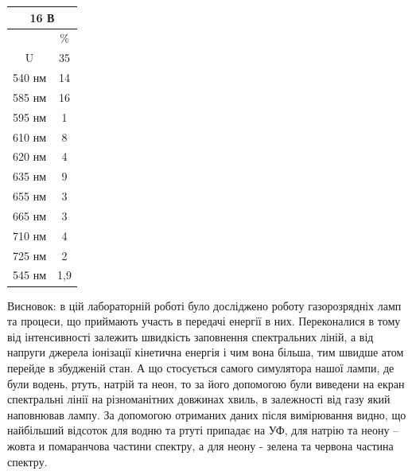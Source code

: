 \documentclass[a4paper,14pt]{extreport}
\begin{document}
\begin{tcolorbox}[colback=red!5,colframe=red!75!black,title=Неон] 
\tcblower
	\begin{center}
		\begin{tabular}{|c|c|}
		\hline
		\multicolumn{2}{|c|}{16 В}                              \\ \hline
		                             & \%                       \\ \hline
		U                       & 35                   \\ \hline
		540 нм                       & 14                      \\ \hline
		585 нм                       & 16                    \\ \hline
		595 нм                       & 1                      \\ \hline
		610 нм                       & 8                    \\ \hline
		620 нм                       & 4                      \\ \hline
		635 нм                       & 9                    \\ \hline
		655 нм                       & 3                    \\ \hline
		665 нм                       & 3                    \\ \hline
		710 нм                       & 4                    \\ \hline
		725 нм                       & 2                     \\ \hline
		\multicolumn{1}{|l|}{545 нм} & \multicolumn{1}{l|}{1,9} \\ \hline
		\end{tabular}
	\end{center}
\end{tcolorbox}





\newpage
Висновок: в цій лабораторній роботі було досліджено роботу газорозрядніх ламп та процеси, що приймають участь в передачі енергії в них. Переконалися в тому від інтенсивності залежить швидкість заповнення спектральних ліній, а від напруги джерела іонізації кінетична енергія і чим вона більша, тим швидше атом перейде в збудженій стан. А що стосується самого симулятора нашої лампи, де були водень, ртуть, натрій та неон, то за його допомогою були виведени на екран спектральні лінії на різноманітних довжинах хвиль, в залежності від газу який наповнював лампу. За допомогою отриманих даних після вимірювання видно, що найбільший відсоток для водню та ртуті припадає на УФ, для натрію та неону -- жовта и помаранчова частини спектру, а для неону - зелена та червона частина спектру.
\end{document}
